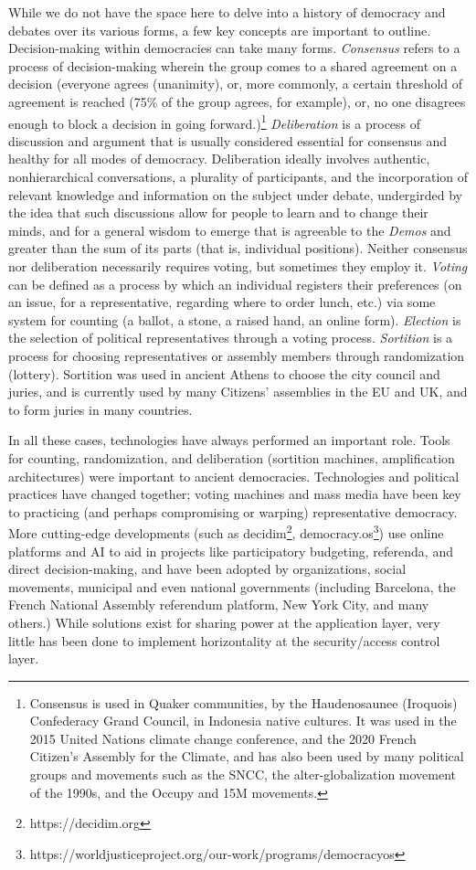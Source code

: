 While we do not have the space here to delve into a history of democracy and
debates over its various forms, a few key concepts are important to outline.
Decision-making within democracies can take many forms. \textit{Consensus} refers to a
process of decision-making wherein the group comes to a shared agreement on a
decision (everyone agrees (unanimity), or, more commonly, a certain threshold of
agreement is reached (75\% of the group agrees, for example), or, no one
disagrees enough to block a decision in going forward.)\footnote{Consensus is
used in Quaker communities, by the Haudenosaunee (Iroquois) Confederacy Grand
Council, in Indonesia native cultures. It was used in the 2015 United Nations
climate change conference, and the 2020 French Citizen’s Assembly for the
Climate, and has also been used by many political groups and movements such as
the SNCC, the alter-globalization movement of the 1990s, and the Occupy and 15M
movements.} \textit{Deliberation} is a process of discussion and argument that is
usually considered essential for consensus and healthy for all modes of
democracy. Deliberation ideally involves authentic, nonhierarchical
conversations, a plurality of participants, and the incorporation of relevant
knowledge and information on the subject under debate, undergirded by the idea
that such discussions allow for people to learn and to change their minds, and for a
general wisdom to emerge that is agreeable to the \textit{Demos} and greater than the sum
of its parts (that is, individual positions). Neither consensus nor
deliberation necessarily requires voting, but sometimes they employ it.
\textit{Voting} can be defined as a process by which an individual registers their
preferences (on an issue, for a representative, regarding where to order lunch,
etc.) via some system for counting (a ballot, a stone, a raised hand, an online
form). \textit{Election} is the selection of political representatives through a voting
process. \textit{Sortition} is a process for choosing representatives or assembly members
through randomization (lottery). Sortition was used in ancient Athens to choose
the city council and juries, and is currently used by many Citizens’ assemblies
in the EU and UK, and to form juries in many countries. 

In all these cases, technologies have always performed an important role. Tools
for counting, randomization, and deliberation (sortition machines, amplification
architectures) were important to ancient democracies. Technologies and political
practices have changed together; voting machines and mass media have been key to
practicing (and perhaps compromising or warping) representative democracy. More
cutting-edge developments (such as decidim\footnote{https://decidim.org}, democracy.os\footnote{https://worldjusticeproject.org/our-work/programs/democracyos}) use online platforms and
AI to aid in projects like participatory budgeting, referenda, and direct
decision-making, and have been adopted by organizations, social movements,
municipal and even national governments (including Barcelona, the French
National Assembly referendum platform, New York City, and many others.) While
solutions exist for sharing power at the application layer, very little has been
done to implement horizontality at the security/access control layer.  

